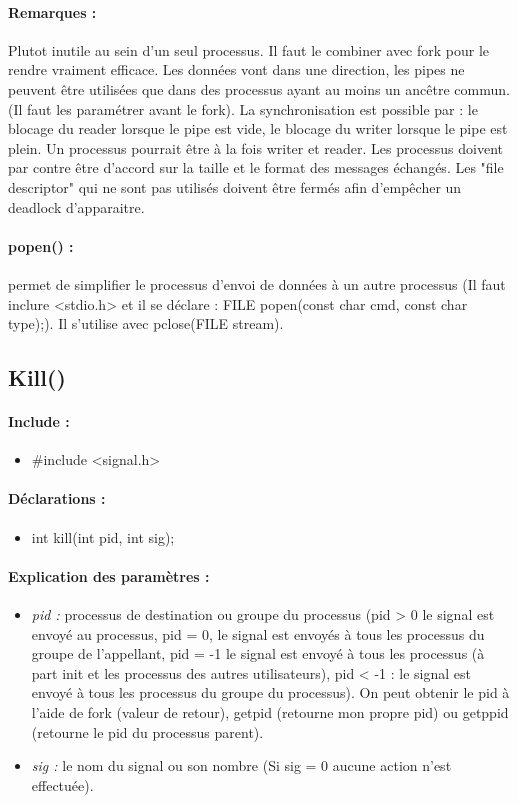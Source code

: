 \documentclass{article}[12pt]
\begin{document}
\paragraph{Remarques : }
Plutot inutile au sein d'un seul processus. Il faut le combiner avec fork pour le rendre vraiment efficace. Les données vont dans une direction, les pipes ne peuvent être utilisées que dans des processus ayant au moins un ancêtre commun. (Il faut les paramétrer avant le fork). La synchronisation est possible par : le blocage du reader lorsque le pipe est vide, le blocage du writer lorsque le pipe est plein. Un processus pourrait être à la fois writer et reader. Les processus doivent par contre être d'accord sur la taille et le format des messages échangés. Les "file descriptor" qui ne sont pas utilisés doivent être fermés afin d'empêcher un deadlock d'apparaitre.
\paragraph{popen() : } permet de simplifier le processus d'envoi de données à un autre processus (Il faut inclure <stdio.h> et il se déclare : FILE \* popen(const char \* cmd, const char \* type);). Il s'utilise avec pclose(FILE \* stream). 
\subsection{Kill()}
\paragraph{Include : }
\begin{itemize}
	\item \#include <signal.h>
\end{itemize}
\paragraph{Déclarations : }
\begin{itemize}
	\item int kill(int pid, int sig);
\end{itemize}
\paragraph{Explication des paramètres : }
\begin{itemize}
	\item \emph{pid : } processus de destination ou groupe du processus (pid > 0 le signal est envoyé au processus, pid = 0, le signal est envoyés à tous les processus du groupe de l'appellant, pid = -1 le signal est envoyé à tous les processus (à part init et les processus des autres utilisateurs), pid < -1 : le signal est envoyé à tous les processus du groupe du processus). On peut obtenir le pid à l'aide de fork (valeur de retour), getpid (retourne mon propre pid) ou getppid (retourne le pid du processus parent).
	\item \emph{sig : } le nom du signal ou son nombre (Si sig = 0 aucune action n'est effectuée). 
\end{itemize}
\end{document}
